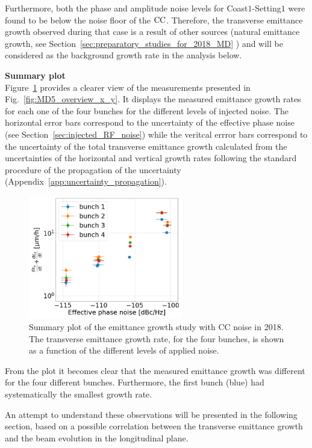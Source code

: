 Furthermore, both the phase and amplitude noise levels for Coast$1$-Setting$1$ were found to be below the noise floor of the ${\mathrm{CC}}$. Therefore, the transverse emittance growth observed during that case is a result of other sources (natural emittance growth, see Section~\ref{sec:preparatory_studies_for_2018_MD} ) and will be considered as the background growth rate in the analysis below. 

\textbf{Summary plot}\\
Figure~\ref{fig:MD5_summary_plot} provides a clearer view of the measurements presented in Fig.~\ref{fig:MD5_overview_x_y}. It displays the measured emittance growth rates for each one of the four bunches for the different levels of injected noise. The horizontal error bars correspond to the uncertainty of the effective phase noise (see Section~\ref{sec:injected_RF_noise}) while the veritcal errror bars correspond to the uncertainty of the total transverse emittance growth calculated from the uncertainties of the horizontal and vertical growth rates following the standard procedure of the propagation of the uncertainty (Appendix~\ref{app:uncertainty_propagation}).

\begin{figure}[!h]
   \centering         
   \includegraphics[width=0.6\textwidth]{images/Ch5/MD5_summary_plot_no_backg_subtraction.png}
       \caption{Summary plot of the emittance growth study with CC noise in 2018. The transverse emittance growth rate, for the four bunches, is shown as a function of the different levels of applied noise.}
       \label{fig:MD5_summary_plot}
\end{figure}

From the plot it becomes clear that the measured emittance growth was different for the four different bunches. Furthermore, the first bunch (blue) had systematically the smallest growth rate.

An attempt to understand these observations will be presented in the following section, based on a possible correlation between the transverse emittance growth and the beam evolution in the longitudinal plane.

